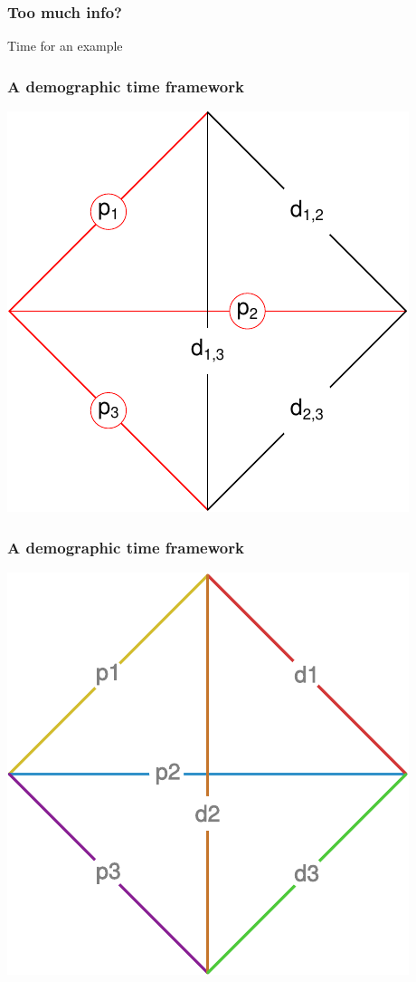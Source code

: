 \documentclass[20pt]{beamer}
\begin{document}
\begin{frame}
\frametitle{Too much info?}
\centering
\huge{Time for an example}
\end{frame}

\begin{frame}
\frametitle{A demographic time framework}
\centering
\includegraphics[scale=1.5]{Figures/edgep3.pdf}\\
\end{frame}

\begin{frame}
\frametitle{A demographic time framework}
\centering
\includegraphics[scale=1.5]{Figures/APCTDLsq.pdf}\\
\end{frame}
\end{document}
